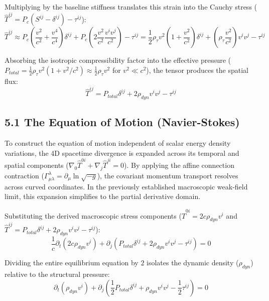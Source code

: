 Multiplying by the baseline stiffness translates this strain into the Cauchy stress ($\hat{T}^{ij} = P_c(S^{ij} - \delta^{ij}) - \tau^{ij}$): 
\begin{equation}
    \hat{T}^{ij} \approx P_c\left(\frac{v^2}{c^2} + \frac{v^4}{c^4}\right)\delta^{ij} + P_c\left(2\frac{v^2}{c^2}\frac{v^i v^j}{c^2}\right) - \tau^{ij} = \frac{1}{2}\rho_\tau v^2\left(1 + \frac{v^2}{c^2}\right)\delta^{ij} + \left(\rho_\tau \frac{v^2}{c^2}\right)v^i v^j - \tau^{ij} 
\end{equation}

Absorbing the isotropic compressibility factor into the effective pressure ($P_{total} = \frac{1}{2}\rho_\tau v^2 (1 + v^2/c^2) \approx \frac{1}{2}\rho_\tau v^2$ for $v^2 \ll c^2$), the tensor produces the spatial flux: 
\begin{equation}
    \hat{T}^{ij} = P_{total}\delta^{ij} + 2 \rho_{dyn} v^i v^j - \tau^{ij} 
\end{equation}

\subsection*{5.1 The Equation of Motion (Navier-Stokes)} 

To construct the equation of motion independent of scalar energy density variations, the 4D spacetime divergence is expanded across its temporal and spatial components ($\nabla_0 \hat{T}^{0i} + \nabla_j \hat{T}^{ji} = 0$). By applying the affine connection contraction ($\Gamma^\lambda_{\mu\lambda} = \partial_\mu \ln\sqrt{-g}$), the covariant momentum transport resolves across curved coordinates. In the previously established macroscopic weak-field limit, this expansion simplifies to the partial derivative domain. 

Substituting the derived macroscopic stress components ($\hat{T}^{0i} = 2c\rho_{dyn}v^i$ and $\hat{T}^{ij} = P_{total} \delta^{ij} + 2\rho_{dyn} v^i v^j - \tau^{ij}$): 
\begin{equation}
    \frac{1}{c}\partial_t (2c \rho_{dyn} v^i) + \partial_j (P_{total} \delta^{ij} + 2\rho_{dyn} v^i v^j - \tau^{ij}) = 0
\end{equation}

Dividing the entire equilibrium equation by $2$ isolates the dynamic density ($\rho_{dyn}$) relative to the structural pressure: 
\begin{equation}
    \partial_t (\rho_{dyn} v^i) + \partial_j \left( \frac{1}{2} P_{total} \delta^{ij} + \rho_{dyn} v^i v^j - \frac{1}{2}\tau^{ij} \right) = 0 
\end{equation}

